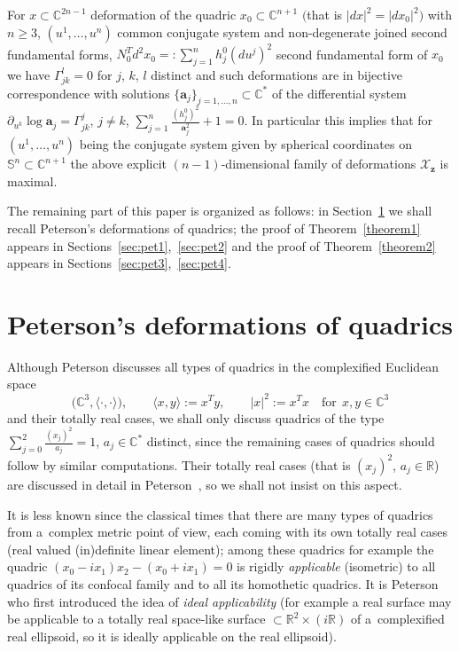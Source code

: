 \documentclass[pdftex]{sigma}
\begin{document}
\begin{theorem}\label{theorem2}
For $x\subset\mathbb{C}^{2n-1}$ deformation of the quadric
$x_0\subset\mathbb{C}^{n+1}$ $($that is $|dx|^2=|dx_0|^2)$ with
$n\ge 3$, $(u^1,\dots ,u^n)$ common conjugate system and
non-degenerate joined second fundamental forms,
$N_0^Td^2x_0=:\sum\limits_{j=1}^nh_j^0(du^j)^2$ second fundamental form
of $x_0$ we have $\Gamma_{jk}^l=0$ for $j$, $k$, $l$ distinct and such
deformations are in bijective correspondence with solutions
$\{\mathbf{a}_j\}_{j=1,\dots ,n}\subset\mathbb{C}^*$ of the
differential system
$\partial_{u^k}\log\mathbf{a}_j=\Gamma_{jk}^j$, $j\neq k$,
$\sum\limits_{j=1}^n\frac{(h_j^0)^2}{\mathbf{a}_j^2}+1=0.$ In particular
this implies that for $(u^1,\dots ,u^n)$ being the conjugate system
given by spherical coordinates on
$\mathbb{S}^n\subset\mathbb{C}^{n+1}$ the above explicit
$(n-1)$-dimensional family of deformations
$\mathcal{X}_{\mathbf{z}}$ is maximal.
\end{theorem}

The remaining part of this paper is organized as follows: in Section~\ref{sec:pet} we shall recall Peterson's deformations of quadrics;
the proof of Theorem~\ref{theorem1}  appears in Sections~\ref{sec:pet1},~\ref{sec:pet2} and the proof of
Theorem~\ref{theorem2} appears in Sections~\ref{sec:pet3},~\ref{sec:pet4}.

\section{Peterson's deformations of quadrics}\label{sec:pet}

Although Peterson \cite{P} discusses all types of quadrics in the
complexif\/ied Euclidean space
\[
\big(\mathbb{C}^3,\langle \cdot,\cdot\rangle\big),\qquad \langle x,y\rangle:=x^Ty,\qquad |x|^2:=x^Tx\quad \mathrm{for}\ \
x,y\in\mathbb{C}^3
\]
and their totally real cases, we shall only discuss quadrics of
the type $\sum\limits_{j=0}^2\frac{(x_j)^2}{a_j}=1$, $a_j\in\mathbb{C}^*$
distinct, since the remaining cases of quadrics should follow by
similar computations. Their totally real cases (that is
$(x_j)^2$, $a_j\in\mathbb{R}$) are discussed in detail in Peterson~\cite{P}, so we shall not insist on this aspect.

\begin{remark}
It is less known since the classical times that there are many
types of quadrics from a~complex metric point of view, each coming
with its own totally real cases (real valued (in)def\/inite linear
element); among these quadrics for example the quadric
$(x_0-ix_1)x_2-(x_0+ix_1)=0$ is rigidly {\it applicable}
(isometric) to all quadrics of its confocal family and to all its
homothetic quadrics. It is Peterson who f\/irst introduced the idea
of {\it ideal applicability} (for example a real surface may be
applicable to a totally real space-like surface
$\subset\mathbb{R}^2\times(i\mathbb{R})$ of a~complexif\/ied real
ellipsoid, so it is ideally applicable on the real ellipsoid).
\end{remark}
\end{document}
